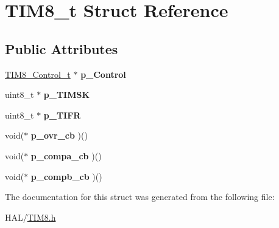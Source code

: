 \hypertarget{struct_t_i_m8__t}{}\section{T\+I\+M8\+\_\+t Struct Reference}
\label{struct_t_i_m8__t}
\subsection*{Public Attributes}
\begin{DoxyCompactItemize}
\item 
\mbox{\label{struct_t_i_m8__t_af46dcfa3644d4c66fa045d497ccfb0c4}} 
\mbox{\hyperlink{struct_t_i_m8___control__t}{T\+I\+M8\+\_\+\+Control\+\_\+t}} $\ast$ {\bfseries p\+\_\+\+Control}
\item 
\mbox{\label{struct_t_i_m8__t_a427feca8a0a963a625eac5caeeb151e9}} 
uint8\+\_\+t $\ast$ {\bfseries p\+\_\+\+T\+I\+M\+SK}
\item 
\mbox{\label{struct_t_i_m8__t_a89575f0143bd690f763a3affda91f141}} 
uint8\+\_\+t $\ast$ {\bfseries p\+\_\+\+T\+I\+FR}
\item 
\mbox{\label{struct_t_i_m8__t_a48f9940192d3732742ace1b6268264d9}} 
void($\ast$ {\bfseries p\+\_\+ovr\+\_\+cb} )()
\item 
\mbox{\label{struct_t_i_m8__t_aa7b39b6d4b1eeefa277e2995561e4979}} 
void($\ast$ {\bfseries p\+\_\+compa\+\_\+cb} )()
\item 
\mbox{\label{struct_t_i_m8__t_a9852b98d8aac3232112d9b059a009bf8}} 
void($\ast$ {\bfseries p\+\_\+compb\+\_\+cb} )()
\end{DoxyCompactItemize}


The documentation for this struct was generated from the following file\+:\begin{DoxyCompactItemize}
\item 
H\+A\+L/\mbox{\hyperlink{_t_i_m8_8h}{T\+I\+M8.\+h}}\end{DoxyCompactItemize}
